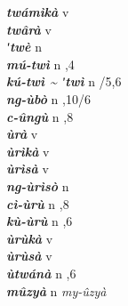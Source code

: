 \begin{multicols}{2}
{{\bfseries\itshape twámìkà}} \relax  v  \relax   \relax  {} \relax   \relax  \\
{{\bfseries\itshape twârà}} \relax  v  \relax   \relax  {} \relax   \relax  \\
{{\bfseries\itshape ʹtwè}} \relax  n   \relax  {} \relax   \relax  \\
{{\bfseries\itshape mú-twì}} \relax  n  ,4  \relax   \relax  \\
{{\bfseries\itshape kú-twì {\textasciitilde} ʹtwì}} \relax  n  /5,6  \relax   \relax  \\
{{\bfseries\itshape ng-ùbò}} \relax  n  ,10/6  \relax   \relax  \\
{{\bfseries\itshape c-ûngù}} \relax  n  ,8  \relax   \relax  \\
{{\bfseries\itshape ùrà}} \relax  v  \relax   \relax  {} \relax  \\
{{\bfseries\itshape ùrìkà}} \relax  v  \relax   \relax  {} \relax   \relax  \\
{{\bfseries\itshape ùrìsà}} \relax  v  \relax   \relax  {} \relax   \relax  \\
{{\bfseries\itshape ng-ùrìsò}} \relax  n   \relax  {} \relax   \relax  \\
{{\bfseries\itshape cì-ùrù}} \relax  n  ,8  \relax   \relax  \\
{{\bfseries\itshape kù-ùrù}} \relax  n  ,6  \relax   \relax  \\
{{\bfseries\itshape ùrùkà}} \relax  v  \relax   \relax  {} \relax   \relax  \\
{{\bfseries\itshape ùrùsà}} \relax  v  \relax   \relax  {} \relax   \relax  \\
{{\bfseries\itshape ùtwánà}} \relax  n  ,6  \relax   \relax  \\
{{\bfseries\itshape mûzyà}} \relax  n   \relax  \textit{my-ûzyà} \relax  \\

\end{multicols}
